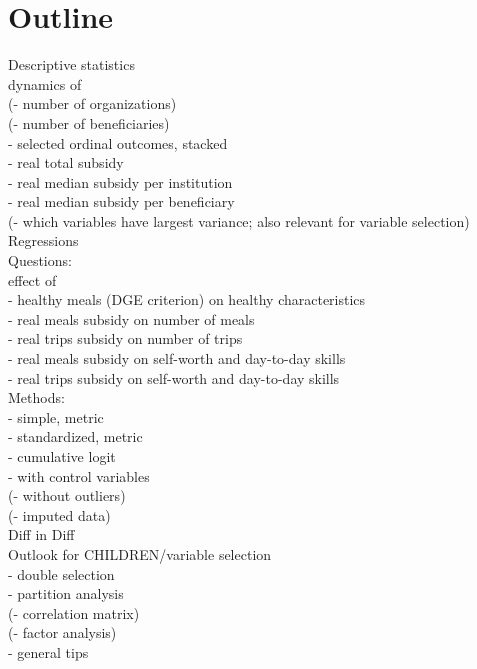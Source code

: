 \documentclass[12pt, a4paper]{article}\usepackage[]{graphicx}\usepackage[]{color}
\begin{document}
\section{Outline}
Descriptive statistics\\
dynamics of\\ 
(- number of organizations)\\
(- number of beneficiaries)\\
- selected ordinal outcomes, stacked\\
- real total subsidy\\
- real median subsidy per institution\\
- real median subsidy per beneficiary\\
(- which variables have largest variance; also relevant for variable selection)\\

Regressions\\

Questions:\\
effect of\\
- healthy meals (DGE criterion) on healthy characteristics\\
- real meals subsidy on number of meals\\
- real trips subsidy on number of trips\\
- real meals subsidy on self-worth and day-to-day skills\\
- real trips subsidy on self-worth and day-to-day skills\\

Methods:\\
- simple, metric\\
- standardized, metric\\
- cumulative logit\\
- with control variables\\
(- without outliers)\\
(- imputed data)\\

Diff in Diff\\

Outlook for CHILDREN/variable selection\\
- double selection \\
- partition analysis\\
(- correlation matrix)\\
(- factor analysis)\\
- general tips\\
\end{document}
